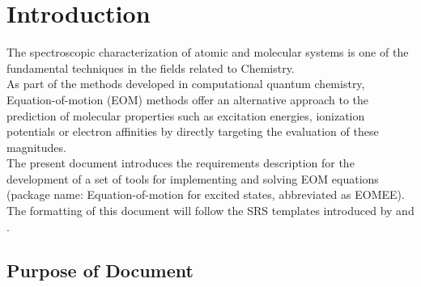 \documentclass[12pt]{article}
\begin{document}
\section{Introduction}


The spectroscopic characterization of atomic and molecular systems is one 
of the fundamental techniques in the fields related to Chemistry. \\
As part of 
the methods developed in computational quantum chemistry, Equation-of-motion 
(EOM) methods offer an alternative approach to the prediction of molecular 
properties such as excitation energies, ionization potentials or electron 
affinities by directly targeting the evaluation of these magnitudes.\\ 
The present document introduces the requirements description for the 
development of a set of tools for implementing and solving EOM 
equations (package name: Equation-of-motion for excited states, abbreviated as 
EOMEE). The formatting of this document will follow the SRS templates 
introduced 
by 
\cite{Smith2016} and \cite{SmithEtAl2007}.


\subsection{Purpose of Document}

\end{document}
